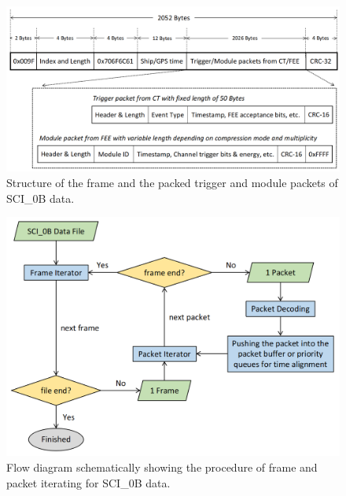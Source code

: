 \documentclass{raa}
\begin{document}
\begin{figure}[!ht]
\centering
\includegraphics[width=14cm]{images/sci_data_frame.png}
\caption{Structure of the frame and the packed trigger and module packets of SCI\_0B data.}\label{fig:sciframe}
\end{figure}

\begin{figure}[!ht]
\centering
\includegraphics[width=12cm]{images/sci_data_decoding.png}
\caption{Flow diagram schematically showing the procedure of frame and packet iterating for SCI\_0B data.}\label{fig:sciframe_iterating}
\end{figure}
\end{document}
